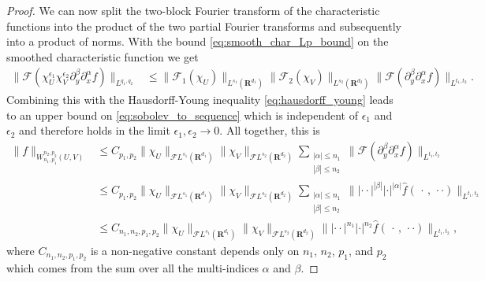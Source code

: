 \documentclass[a4paper]{article}
\newcommand{\rr}[1]{\mathbf{R}^{#1}}
\newcommand{\rrI}{\rr{d_1}}
\newcommand{\rrII}{\rr{d_2}}
\newcommand{\abs}[1]{| #1|}     %
\newcommand{\cdo}{\, \cdot \, }
\newcommand{\norm}[2]{\|#1\|_{#2}}
\newcommand{\F}[0]{\mathscr{F}}
\newcommand{\FL}[1]{\F L^{#1}}
\newcommand{\chF}[1]{\chi_{#1}}
\newcommand{\chEF}[2]{\chF{#1}^{#2}}
\numberwithin{equation}{section}
\theoremstyle{remark}
\begin{document}
\begin{proof}
    We can now split the two-block Fourier transform
    of the characteristic functions
    into the product of the two partial Fourier transforms
    and subsequently into a product of norms.
    With the bound \cref{eq:smooth_char_Lp_bound} on the smoothed characteristic function we get
    \begin{align*}
        \norm{\mathscr{F}\left(\chEF{U}{\epsilon_1}\chEF{V}{\epsilon_2}
        {\partial_y^\beta\partial_x^\alpha f}\right)}{L^{q_1,q_2}}
        &\leq
        \norm{\mathscr{F}_1({\chF{U}})}{L^{s_1}(\rrI)}
        \norm{\mathscr{F}_2({\chF{V}})}{L^{s_2}(\rrII)}
        \norm{\mathscr{F}{\left(\partial_y^\beta\partial_x^\alpha f\right)}}{L^{t_1,t_2}}.
    \end{align*}
    Combining this with the Hausdorff-Young inequality \cref{eq:hausdorff_young} 
    leads to an upper bound on \cref{eq:sobolev_to_sequence}
    which is independent of $\epsilon_1$ and $\epsilon_2$ and therefore holds in the limit $\epsilon_1,\epsilon_2\to 0$.
    All together, this is
    \begin{subequations}
    \begin{align*}
        \norm{f}{W_{n_1,p_1}^{n_2,p_2}(U, V)}
        &\leq C_{p_1,p_2}
        \norm{{\chF{U}}}{\FL{s_1}(\rrI)}
        \norm{{\chF{V}}}{\FL{s_2}(\rrII)}
        \sum_{\substack{|\alpha|\leq n_1\\|\beta|\leq n_2}}
        \norm{\mathscr{F}{\left(\partial_y^\beta\partial_x^\alpha f\right)}}{L^{t_1,t_2}}
        \\
        &\leq C_{p_1,p_2}
        \norm{{\chF{U}}}{\FL{s_1}(\rrI)}
        \norm{{\chF{V}}}{\FL{s_2}(\rrII)}
        \sum_{\substack{|\alpha|\leq n_1\\|\beta|\leq n_2}}
        \norm{\abs{\cdot\cdot}^{|\beta|}\abs{\cdot}^{|\alpha|} \widehat{f}(\cdo, \, \cdot\cdot)}{L^{t_1,t_2}}
        \\
        &\leq C_{n_1,n_2,p_1,p_2}
        \norm{{\chF{U}}}{\FL{s_1}(\rrI)}
        \norm{{\chF{V}}}{\FL{s_2}(\rrII)}
        \norm{\abs{\cdot\cdot}^{n_1}\abs{\cdot}^{n_2} \widehat{f}(\cdo, \, \cdot\cdot)}{L^{t_1,t_2}},
    \end{align*}
    \end{subequations}
    where $C_{n_1,n_2,p_1,p_2}$ is a non-negative constant depends only on $n_1$, $n_2$, $p_1$, and $p_2$
    which comes from the sum over all the multi-indices $\alpha$ and $\beta$.
    

\end{proof}
\end{document}

